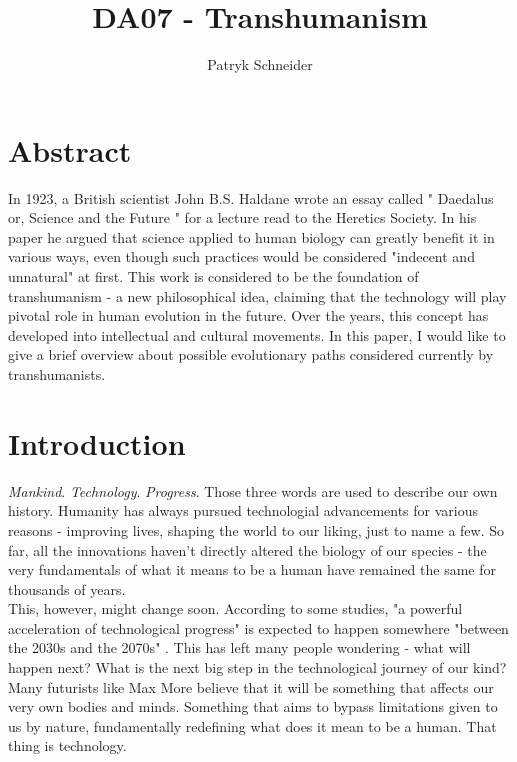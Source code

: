 \documentclass[12pt]{article}
\begin{document}
\author{Patryk Schneider}
\title{DA07 - Transhumanism}
\maketitle

\section{Abstract}
	In 1923, a British scientist John B.S. Haldane wrote an essay called " Daedalus\; or, Science and the Future " for a lecture read to the Heretics Society. In his paper he argued that science applied to human biology can greatly benefit it in various ways, even though such practices would be considered "indecent and unnatural" \cite{haldane} at first. This work is considered to be the foundation of transhumanism - a new philosophical idea, claiming that the technology will play pivotal role in human evolution in the future. Over the years, this concept has developed into intellectual and cultural movements. In this paper, I would like to give a brief overview about possible evolutionary paths considered currently by transhumanists.

\newpage

\section{Introduction}
	\emph{Mankind}. \emph{Technology}. \emph{Progress}. Those three words are used to describe our own history. Humanity has always pursued technologial advancements for various reasons - improving lives, shaping the world to our liking, just to name a few. So far, all the innovations haven't directly altered the biology of our species - the very fundamentals of what it means to be a human have remained the same for thousands of years. 
	\\This, however, might change soon. According to some studies, "a powerful acceleration of technological progress" is expected to happen somewhere "between the 2030s and the 2070s"  \cite{progressRate}. This has left many people wondering - what will happen next? What is the next big step in the technological journey of our kind?
	\\Many futurists like Max More believe that it will be something that affects our very own bodies and minds. Something that aims to bypass limitations given to us by nature, fundamentally redefining what does it mean to be a human. That thing is technology.
\end{document}
